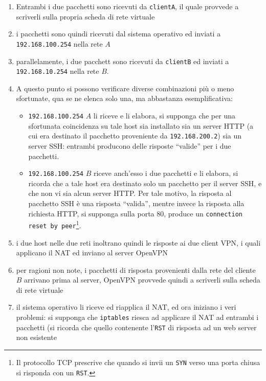 \begin{enumerate}
{  piuttosto concentrati sulla soluzione di tale probelma.}) che entrambi i due pacchetti
  siano inviato ad entrambi i due client.
  \item Entrambi i due pacchetti sono ricevuti da \texttt{clientA}, il quale provvede
  a scriverli sulla propria scheda di rete virtuale
  \item i pacchetti sono quindi ricevuti dal sistema operativo ed inviati a
  \texttt{192.168.100.254} nella rete $A$
  \item parallelamente, i due pacchett sono ricevuti da \texttt{clientB} ed inviati a
  \texttt{192.168.10.254} nella rete $B$.
  \item A questo punto si possono verificare diverse combinazioni più o meno
  sfortunate, qua se ne elenca solo una, ma abbastanza esemplificativa:
  \begin{itemize}
    \item \texttt{192.168.100.254} $A$ li riceve e li elabora, si supponga che per una sfortunata
    coincidenza su tale host sia installato sia un server HTTP (a cui era destinato il
    pacchetto proveniente da \texttt{192.168.200.2}) sia un server SSH: entrambi
    producono delle risposte ``valide'' per i due pacchetti.
    \item \texttt{192.168.100.254} $B$ riceve anch'esso i due pacchetti e li elabora, si ricorda
    che a tale host era destinato solo un pacchetto per il server SSH, e che non vi
    sia alcun server HTTP. Per tale motivo, la risposta al pacchetto SSH è una
    risposta ``valida'', mentre invece la risposta alla richiesta HTTP, si supponga
    sulla porta 80, produce un \texttt{connection reset by peer}\footnote{Il protocollo TCP
    prescrive che quando si invii un \texttt{SYN} verso una porta chiusa si risponda
    con un \texttt{RST}.}.
  \end{itemize}
  \item i due host nelle due reti inoltrano quindi le risposte ai due client VPN, i quali
  applicano il NAT ed inviano al server OpenVPN
  \item per ragioni non note, i pacchetti di risposta provenienti dalla rete del cliente $B$
  arrivano prima al server, OpenVPN provvede quindi a scriverli sulla scheda di rete
  virtuale
  \item il sistema operativo li riceve ed riapplica il NAT, ed ora iniziano i veri problemi:
  si supponga che \texttt{iptables} riesca ad applicare il NAT ad entrambi i pacchetti
  (si ricorda che quello contenente l'\texttt{RST} di risposta ad un web server non esistente

\end{enumerate}
